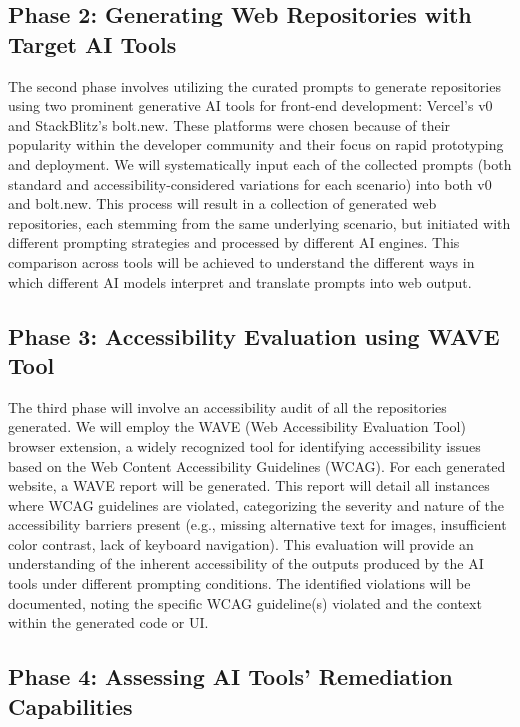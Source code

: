 \documentclass{article}
\begin{document}
\subsection{Phase 2: Generating Web Repositories with Target AI Tools}

The second phase involves utilizing the curated prompts to generate repositories using two prominent generative AI tools for front-end development:
Vercel's v0 and StackBlitz's bolt.new.
These platforms were chosen because of their popularity within the developer community and their focus on rapid prototyping and deployment.
We will systematically input each of the collected prompts (both standard and accessibility-considered variations for each scenario) into both v0 and bolt.new.
This process will result in a collection of generated web repositories, each stemming from the same underlying scenario,
but initiated with different prompting strategies and processed by different AI engines.
This comparison across tools will be achieved to understand the different ways in which different AI models interpret and translate prompts into web output.

\subsection{Phase 3: Accessibility Evaluation using WAVE Tool}

The third phase will involve an accessibility audit of all the repositories generated.
We will employ the WAVE (Web Accessibility Evaluation Tool) browser extension,
a widely recognized tool for identifying accessibility issues based on the Web Content Accessibility Guidelines (WCAG).
For each generated website, a WAVE report will be generated.
This report will detail all instances where WCAG guidelines are violated,
categorizing the severity and nature of the accessibility barriers present
(e.g., missing alternative text for images, insufficient color contrast, lack of keyboard navigation).
This evaluation will provide an understanding of the inherent accessibility of the outputs produced by the AI tools under different prompting conditions.
The identified violations will be documented, noting the specific WCAG guideline(s) violated and the context within the generated code or UI.

\subsection{Phase 4: Assessing AI Tools' Remediation Capabilities}
\end{document}
